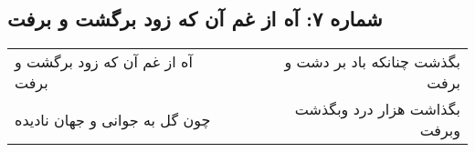 \begin{center}
\section*{شماره ۷: آه از غم آن که زود برگشت و برفت}
\label{sec:007}
\begin{longtable}{l p{0.5cm} r}
آه از غم آن که زود برگشت و برفت
&&
بگذشت چنانکه باد بر دشت و برفت
\\
چون گل به جوانی و جهان نادیده
&&
بگذاشت هزار درد وبگذشت وبرفت
\\
\end{longtable}
\end{center}
